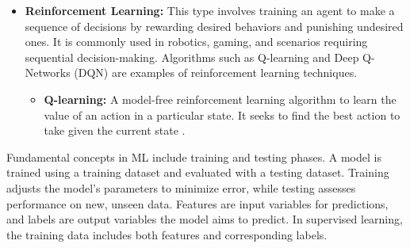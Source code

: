 \begin{itemize}
    \item \textbf{Reinforcement Learning:} This type involves training an agent to make a sequence of decisions by rewarding desired behaviors and punishing undesired ones. It is commonly used in robotics, gaming, and scenarios requiring sequential decision-making. Algorithms such as Q-learning and Deep Q-Networks (DQN) are examples of reinforcement learning techniques.
        \begin{itemize}
            \item \textbf{Q-learning:} A model-free reinforcement learning algorithm to learn the value of an action in a particular state. It seeks to find the best action to take given the current state \cite{Ref10}.
        \end{itemize}
\end{itemize}

Fundamental concepts in ML include training and testing phases. A model is trained using a training dataset and evaluated with a testing dataset. Training adjusts the model's parameters to minimize error, while testing assesses performance on new, unseen data. Features are input variables for predictions, and labels are output variables the model aims to predict. In supervised learning, the training data includes both features and corresponding labels.

